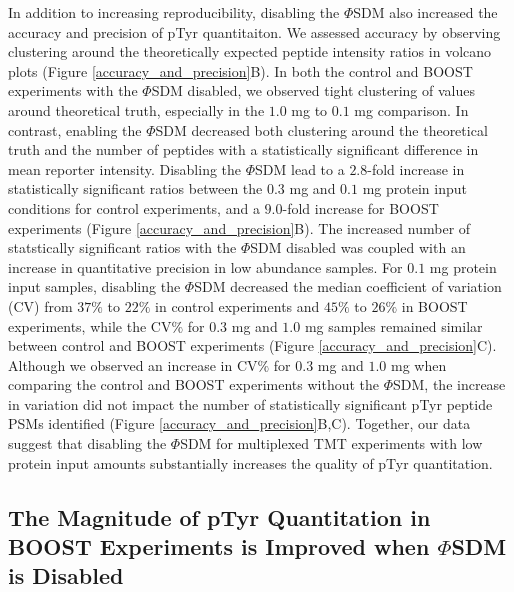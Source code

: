 \documentclass[journal=jprobs,manuscript=article]{achemso}
\begin{document}
In addition to increasing reproducibility, disabling the $\Phi$SDM also increased the accuracy and precision of pTyr quantitaiton. We assessed accuracy by observing clustering around the theoretically expected peptide intensity ratios in volcano plots (Figure \ref{accuracy_and_precision}B). In both the control and BOOST experiments with the $\Phi$SDM disabled, we observed tight clustering of values around theoretical truth, especially in the $1.0$ mg to $0.1$ mg comparison. In contrast, enabling the $\Phi$SDM decreased both clustering around the theoretical truth and the number of peptides with a statistically significant difference in mean reporter intensity. Disabling the $\Phi$SDM lead to a $2.8$-fold increase in statistically significant ratios between the $0.3$ mg and $0.1$ mg protein input conditions for control experiments, and a $9.0$-fold increase for BOOST experiments (Figure \ref{accuracy_and_precision}B). The increased number of statstically significant ratios with the $\Phi$SDM disabled was coupled with an increase in quantitative precision in low abundance samples. For $0.1$ mg protein input samples, disabling the $\Phi$SDM decreased the median coefficient of variation (CV) from $37\%$ to $22\%$ in control experiments and $45\%$ to $26\%$ in BOOST experiments, while the CV$\%$ for $0.3$ mg and $1.0$ mg samples remained similar between control and BOOST experiments (Figure \ref{accuracy_and_precision}C). Although we observed an increase in CV$\%$ for $0.3$ mg and $1.0$ mg when comparing the control and BOOST experiments without the $\Phi$SDM, the increase in variation did not impact the number of statistically significant pTyr peptide PSMs identified (Figure \ref{accuracy_and_precision}B,C). Together, our data suggest that disabling the $\Phi$SDM for multiplexed TMT experiments with low protein input amounts substantially increases the quality of pTyr quantitation.


\subsection{The Magnitude of pTyr Quantitation in BOOST Experiments is Improved when $\Phi$SDM is Disabled}
\end{document}
